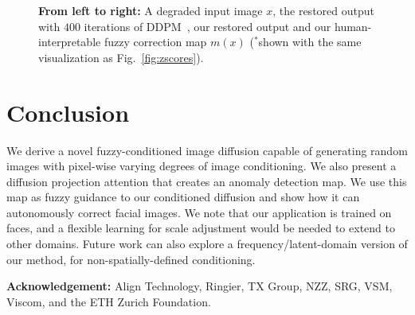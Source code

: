 \documentclass{article}
\begin{document}
\begin{figure}[t]{}


    \vspace{-0.2cm}        
    \caption{\textbf{From left to right:} A degraded input image $x$, the restored output with $400$ iterations of DDPM~\cite{ho2020denoising}, our restored output and our human-interpretable fuzzy correction map $m(x)$ ($^*$shown with the same visualization as Fig.~\ref{fig:zscores}).}
    \label{fig:dgd_results}
\end{figure}

\section{Conclusion} \label{sec:ccl}
We derive a novel fuzzy-conditioned image diffusion capable of generating random images with pixel-wise varying degrees of image conditioning. We also present a diffusion projection attention that creates an anomaly detection map. We use this map as fuzzy guidance to our conditioned diffusion and show how it can autonomously correct facial images. We note that our application is trained on faces, and a flexible learning for scale adjustment would be needed to extend to other domains. Future work can also explore a frequency/latent-domain version of our method, for non-spatially-defined conditioning. 


\noindent \textbf{Acknowledgement:} Align Technology, Ringier, TX Group, NZZ, SRG, VSM, Viscom, and the ETH Zurich Foundation.

\newpage


\end{document}
